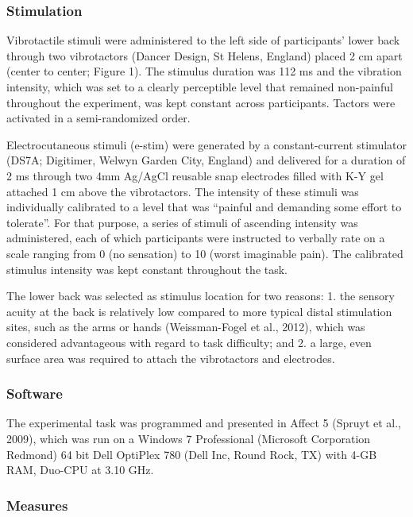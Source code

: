 \documentclass[twocolumn, serif, authordate, review]{jote-article}
\begin{document}
\subsubsection*{Stimulation}Vibrotactile stimuli were administered to the left side of participants' lower back through two vibrotactors (Dancer Design, St Helens, England) placed 2 cm apart (center to center; Figure 1). The stimulus duration was 112 ms and the vibration intensity, which was set to a clearly perceptible level that remained non-painful throughout the experiment, was kept constant across participants. Tactors were activated in a semi-randomized order.

Electrocutaneous stimuli (e-stim) were generated by a constant-current stimulator (DS7A; Digitimer, Welwyn Garden City, England) and delivered for a duration of 2 ms through two 4mm Ag/AgCl reusable snap electrodes filled with K-Y gel attached 1 cm above the vibrotactors. The intensity of these stimuli was individually calibrated to a level that was ``painful and demanding some effort to tolerate''. For that purpose, a series of stimuli of ascending intensity was administered, each of which participants were instructed to verbally rate on a scale ranging from 0 (no sensation) to 10 (worst imaginable pain). The calibrated stimulus intensity was kept constant throughout the task.

The lower back was selected as stimulus location for two reasons: 1. the sensory acuity at the back is relatively low compared to more typical distal stimulation sites, such as the arms or hands (Weissman-Fogel et al., 2012), which was considered advantageous with regard to task difficulty; and 2. a large, even surface area was required to attach the vibrotactors and electrodes.

\subsubsection*{Software}The experimental task was programmed and presented in Affect 5 (Spruyt et al., 2009), which was run on a Windows 7 Professional (Microsoft Corporation Redmond) 64 bit Dell OptiPlex 780 (Dell Inc, Round Rock, TX) with 4-GB RAM, Duo-CPU at 3.10 GHz.


\subsubsection*{Measures}
\end{document}
